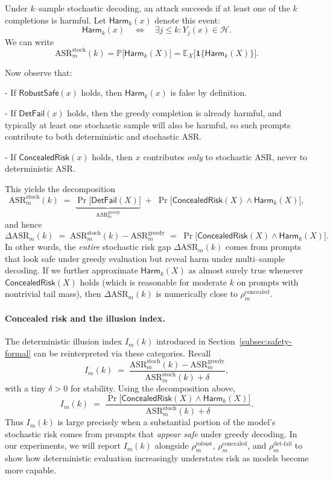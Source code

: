 Under $k$--sample stochastic decoding, an attack succeeds if at least
one of the $k$ completions is harmful.
Let $\mathsf{Harm}_k(x)$ denote this event:
\[
  \mathsf{Harm}_k(x)
  \quad\Leftrightarrow\quad
  \exists j \le k : Y_j(x) \in \mathcal{H}.
\]
We can write
\[
  \mathrm{ASR}_m^{\text{stoch}}(k)
  =
  \mathbb{P}\big[ \mathsf{Harm}_k(X) \big]
  =
  \mathbb{E}_{X}
  \big[ \mathbf{1}\{\mathsf{Harm}_k(X)\} \big].
\]


Now observe that:

- If $\mathsf{RobustSafe}(x)$ holds, then
  $\mathsf{Harm}_k(x)$ is false by definition.

- If $\mathsf{DetFail}(x)$ holds, then the greedy completion is already
  harmful, and typically at least one stochastic sample will also be
  harmful, so such prompts contribute to both deterministic and
  stochastic ASR.

- If $\mathsf{ConcealedRisk}(x)$ holds, then $x$ contributes
  \emph{only} to stochastic ASR, never to deterministic ASR.

This yields the decomposition
\[
  \mathrm{ASR}_m^{\text{stoch}}(k)
  \;=\;
  \underbrace{
    \Pr\big[ \mathsf{DetFail}(X) \big]
  }_{\mathrm{ASR}_m^{\text{greedy}}}
  \;+\;
  \Pr\big[ \mathsf{ConcealedRisk}(X)
           \wedge \mathsf{Harm}_k(X) \big],
\]
and hence
\[
  \Delta \mathrm{ASR}_m(k)
  \;=\;
  \mathrm{ASR}_m^{\text{stoch}}(k)
  - \mathrm{ASR}_m^{\text{greedy}}
  \;=\;
  \Pr\big[ \mathsf{ConcealedRisk}(X)
           \wedge \mathsf{Harm}_k(X) \big].
\]
In other words, the \emph{entire} stochastic risk gap
$\Delta \mathrm{ASR}_m(k)$ comes from prompts that look safe under
greedy evaluation but reveal harm under multi--sample decoding.
If we further approximate $\mathsf{Harm}_k(X)$ as almost surely true
whenever $\mathsf{ConcealedRisk}(X)$ holds (which is reasonable for
moderate $k$ on prompts with nontrivial tail mass), then
$\Delta \mathrm{ASR}_m(k)$ is numerically close to
$\rho^{\text{concealed}}_m$.

\paragraph{Concealed risk and the illusion index.}
The deterministic illusion index $I_m(k)$ introduced in
Section~\ref{subsec:safety-formal} can be reinterpreted via these
categories.
Recall
\[
  I_m(k)
  \;=\;
  \frac{\mathrm{ASR}_m^{\text{stoch}}(k)
        - \mathrm{ASR}_m^{\text{greedy}}}
       {\mathrm{ASR}_m^{\text{stoch}}(k) + \delta},
\]
with a tiny $\delta > 0$ for stability.
Using the decomposition above,
\[
  I_m(k)
  \;=\;
  \frac{\Pr\big[ \mathsf{ConcealedRisk}(X)
                 \wedge \mathsf{Harm}_k(X) \big]}
       {\mathrm{ASR}_m^{\text{stoch}}(k) + \delta}.
\]
Thus $I_m(k)$ is large precisely when a substantial portion of the
model’s stochastic risk comes from prompts that \emph{appear safe} under
greedy decoding.
In our experiments, we will report $I_m(k)$ alongside
$\rho^{\text{robust}}_m$, $\rho^{\text{concealed}}_m$, and
$\rho^{\text{det-fail}}_m$ to show how deterministic evaluation
increasingly understates risk as models become more capable.

